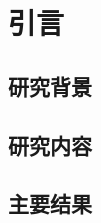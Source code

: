 \chapter*{引\hspace{1.75\ccwd}言}

\section{研究背景}

\cite{Cowen1978}

\section{研究内容}



\section{主要结果}


